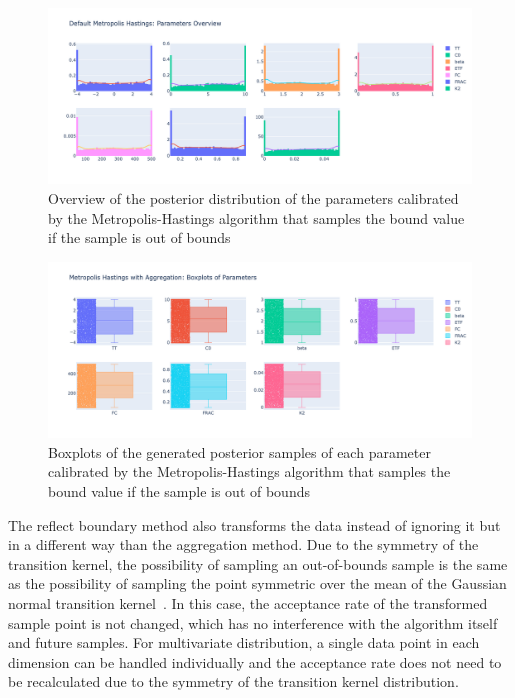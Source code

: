 \begin{figure}[H]
    \centering
    \includegraphics[width=1\textwidth]{figures/basic_mh/aggr_mh/aggr_mh_parameters_overview.png}
    \captionsetup{width=.8\textwidth}
    \caption{Overview of the posterior distribution of the parameters calibrated by the Metropolis-Hastings algorithm that samples the bound value if the sample is out of bounds}
    \label{fig:enter-label}
\end{figure}

\begin{figure}[H]
    \centering
    \includegraphics[width=1\textwidth]{figures/basic_mh/aggr_mh/aggr_mh_boxplot.png}
    \captionsetup{width=.8\textwidth}
    \caption{Boxplots of the generated posterior samples of each parameter
calibrated by the Metropolis-Hastings algorithm that samples the bound value if the sample is out of bounds}
    \label{fig:enter-label}
\end{figure}



The reflect boundary method also transforms the data instead of ignoring it but in a different way than the aggregation method. Due to the symmetry of the transition kernel, the possibility of sampling an out-of-bounds sample is the same as the possibility of sampling the point symmetric over the mean of the Gaussian normal transition kernel~\cite{gaussian_distribution_property}. In this case, the acceptance rate of the transformed sample point is not changed, which has no interference with the algorithm itself and future samples. For multivariate distribution, a single data point in each dimension can be handled individually and the acceptance rate does not need to be recalculated due to the symmetry of the transition kernel distribution. 

